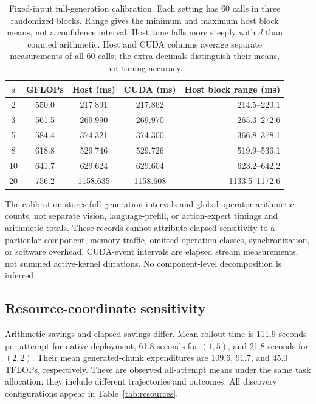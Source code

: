 \documentclass{article}
\begin{document}
\begin{table}[htbp]
\centering\small
\caption{Fixed-input full-generation calibration. Each setting has 60 calls in
three randomized blocks. Range gives the minimum and maximum host block means,
not a confidence interval. Host time falls more steeply with $d$ than counted
arithmetic. Host and CUDA columns average separate measurements of all 60 calls; the extra decimals distinguish their means, not timing accuracy.}
\begin{tabular}{@{}cS[table-format=3.1]S[table-format=4.3]S[table-format=4.3]r@{}}
\toprule
$d$ & {GFLOPs} & {Host (ms)} & {CUDA (ms)} & Host block range (ms)\\
 & 550.0 & 217.891 & 217.862 & 214.5--220.1\\
3 & 561.5 & 269.990 & 269.970 & 265.3--272.6\\
5 & 584.4 & 374.321 & 374.300 & 366.8--378.1\\
8 & 618.8 & 529.746 & 529.726 & 519.9--536.1\\
10 & 641.7 & 629.624 & 629.604 & 623.2--642.2\\
20 & 756.2 & 1158.635 & 1158.608 & 1133.5--1172.6\\
\bottomrule
\end{tabular}
\end{table}

The calibration stores full-generation intervals and global operator arithmetic
counts, not separate vision, language-prefill, or action-expert timings and
arithmetic totals. These records cannot attribute elapsed sensitivity to a
particular component, memory traffic, omitted operation classes, synchronization,
or software overhead. CUDA-event intervals are elapsed stream measurements,
not summed active-kernel durations. No component-level decomposition is inferred.

\subsection{Resource-coordinate sensitivity}
\label{app:timing-sensitivity}

Arithmetic savings and elapsed savings differ. Mean rollout time is 111.9 seconds
per attempt for native deployment, 61.8 seconds for $(1,5)$, and 21.8 seconds for
$(2,2)$. Their mean generated-chunk expenditures are 109.6, 91.7, and 45.0 TFLOPs,
respectively. These are observed all-attempt means under the same task allocation;
they include different trajectories and outcomes. All discovery configurations
appear in Table~\ref{tab:resources}.
\end{document}

